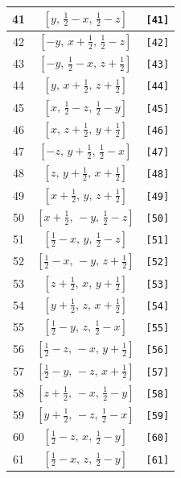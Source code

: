 \documentclass[fleqn,8pt]{jsarticle}
\begin{document}
\begin{longtable}{ccc}
41 & $\left[ y,\, \frac{1}{2} - x,\, \frac{1}{2} - z \right]$ & {\tt [41]} \\ \hline
42 & $\left[ - y,\, x + \frac{1}{2},\, \frac{1}{2} - z \right]$ & {\tt [42]} \\ \hline
43 & $\left[ - y,\, \frac{1}{2} - x,\, z + \frac{1}{2} \right]$ & {\tt [43]} \\ \hline
44 & $\left[ y,\, x + \frac{1}{2},\, z + \frac{1}{2} \right]$ & {\tt [44]} \\ \hline
45 & $\left[ x,\, \frac{1}{2} - z,\, \frac{1}{2} - y \right]$ & {\tt [45]} \\ \hline
46 & $\left[ x,\, z + \frac{1}{2},\, y + \frac{1}{2} \right]$ & {\tt [46]} \\ \hline
47 & $\left[ - z,\, y + \frac{1}{2},\, \frac{1}{2} - x \right]$ & {\tt [47]} \\ \hline
48 & $\left[ z,\, y + \frac{1}{2},\, x + \frac{1}{2} \right]$ & {\tt [48]} \\ \hline
49 & $\left[ x + \frac{1}{2},\, y,\, z + \frac{1}{2} \right]$ & {\tt [49]} \\ \hline
50 & $\left[ x + \frac{1}{2},\, - y,\, \frac{1}{2} - z \right]$ & {\tt [50]} \\ \hline
51 & $\left[ \frac{1}{2} - x,\, y,\, \frac{1}{2} - z \right]$ & {\tt [51]} \\ \hline
52 & $\left[ \frac{1}{2} - x,\, - y,\, z + \frac{1}{2} \right]$ & {\tt [52]} \\ \hline
53 & $\left[ z + \frac{1}{2},\, x,\, y + \frac{1}{2} \right]$ & {\tt [53]} \\ \hline
54 & $\left[ y + \frac{1}{2},\, z,\, x + \frac{1}{2} \right]$ & {\tt [54]} \\ \hline
55 & $\left[ \frac{1}{2} - y,\, z,\, \frac{1}{2} - x \right]$ & {\tt [55]} \\ \hline
56 & $\left[ \frac{1}{2} - z,\, - x,\, y + \frac{1}{2} \right]$ & {\tt [56]} \\ \hline
57 & $\left[ \frac{1}{2} - y,\, - z,\, x + \frac{1}{2} \right]$ & {\tt [57]} \\ \hline
58 & $\left[ z + \frac{1}{2},\, - x,\, \frac{1}{2} - y \right]$ & {\tt [58]} \\ \hline
59 & $\left[ y + \frac{1}{2},\, - z,\, \frac{1}{2} - x \right]$ & {\tt [59]} \\ \hline
60 & $\left[ \frac{1}{2} - z,\, x,\, \frac{1}{2} - y \right]$ & {\tt [60]} \\ \hline
61 & $\left[ \frac{1}{2} - x,\, z,\, \frac{1}{2} - y \right]$ & {\tt [61]} \\ \hline

\end{longtable}
\end{document}
